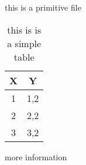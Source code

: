 \documentclass[11pt]{article}
\begin{document}
    
    this is a primitive file
    
    

    \begin{table}[h!]
        \centering
        \begin{tabular}
        {| c | c |}
            \hline
            X & Y \\
            \hline
            1 & 1,2 \\
            \hline
            2 & 2,2 \\
            \hline
            3 & 3,2 \\
            \hline
        \end{tabular}
        \label{SimpleTable2}
        \caption{this is is a simple table}
    \end{table}
    
    more information
\end{document}
